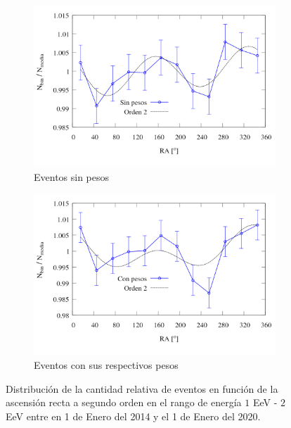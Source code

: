         \begin{figure}[H]
          \centering
            \begin{subfigure}[b]{0.5\textwidth}
		\centering
		\includegraphics[width=\linewidth]{eventos_clasificados_por_RA_v7_orden_2_sin_pesos.png}
		\caption{Eventos sin pesos}		\label{fig:bin_events_second_order_sin}
            \end{subfigure}%
            \begin{subfigure}[b]{0.5\textwidth}
		\centering
		\includegraphics[width=\linewidth]{eventos_clasificados_por_RA_v7_orden_2_con_pesos.png}
		\caption{ Eventos con sus respectivos pesos}		\label{fig:bin_events_second_order_con}
            \end{subfigure}
           \caption{Distribución de la cantidad relativa de eventos en función de la ascensión recta a segundo orden en el rango de energía $1$ EeV - $2$ EeV entre en 1 de Enero del 2014 y el 1 de Enero del 2020.}
         \end{figure}

